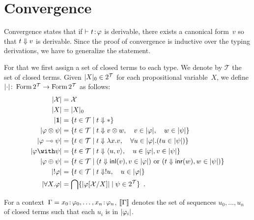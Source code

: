 \section{Convergence}

Convergence states that if
$\vdash{t} \mathord{\colon\kern -2pt}{\varphi}$ is derivable,
there exists a canonical form~$v$ so that $t\Downarrow v$ is derivable.
Since the proof of convergence is inductive over
the typing derivations, we have to generalize the statement.

For that we first assign a set of closed terms to each type.
\newcommand{\terms}{\mathcal{T}}
We denote by $\terms$ the set of closed terms.
Given $\sem{X}_0\in 2^\terms$ for each propositional variable~$X$,
we define $\sem{\cdot}\colon \form{2^\terms}\rightarrow \form{2^\terms}$
as follows:
\begin{align*}
 \sem{\mathcal X} &= \mathcal X\\
 \sem{X} &= \sem{X}_0\\
 \sem{\one} &= \{t\in \terms \mid t\eval \ast\} \\
 \sem{\phi\otimes \psi}&= \{t\in\terms \mid t\eval v\otimes w,\quad
 v\in\sem{\phi},\quad w\in \sem{\psi}\}\\
 \sem{\phi\limp\psi}&= \{t\in\terms \mid t\eval \lambda x.v,\quad
 \forall u\in\sem{\phi}.(tu\in\sem{\psi})\}\\
 \sem{\phi\with\psi}&= \{t\in\terms \mid t\eval\lpair{u,v},\quad
 u\in\sem{\phi}, v\in\sem{\psi}\}\\
 \sem{\phi\oplus\psi}&= \{t\in\terms\mid (t\eval \inl{v}, v\in
 \sem{\phi})\text{ or }(t\eval\inr{w}, w \in \sem{\psi})\}\\
 \sem{!\phi}&= \{t\in\terms \mid t\eval !u, \quad u\in\sem{\phi}\}\\
 \sem{\forall X.\phi}&= \bigcap\{\sem{\phi[\mathcal X/X]}\mid \psi\in
 2^\terms\}\enspace.
\end{align*}

For a context~$\Gamma = {x_0} \mathord{\colon\kern -2pt}{\varphi_0},\ldots,{x_n} \mathord{\colon\kern -2pt}{\varphi_n}$,
$\llbracket{\Gamma}\rrbracket$ denotes the set of sequences $u_0,\ldots,u_n$ of closed terms
such that each $u_i$ is in $|{\varphi_i}|$.

